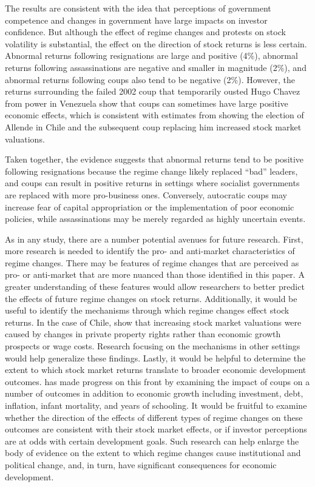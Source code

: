 \documentclass[12pt,final,fleqn]{article}
\theoremstyle{plain}
\begin{document}
The results are consistent with the idea that perceptions of government competence and changes in government have large impacts on investor confidence. But although the effect of regime changes and protests on stock volatility is substantial, the effect on the direction of stock returns is less certain. Abnormal returns following resignations are large and positive (4\%), abnormal returns following assassinations are negative and smaller in magnitude (2\%), and abnormal returns following coups also tend to be negative (2\%). However, the returns surrounding the failed 2002 coup that temporarily ousted Hugo Chavez from power in Venezuela show that coups can sometimes have large positive economic effects, which is consistent with estimates from \citet{girardi2018institution} showing  the election of Allende in Chile and the subsequent coup replacing him increased stock market valuations. 

Taken together, the evidence suggests that abnormal returns tend to be positive following resignations because the regime change likely replaced ``bad'' leaders, and coups can result in positive returns in settings where socialist governments are replaced with more pro-business ones. Conversely, autocratic coups may increase fear of capital appropriation or the implementation of poor economic policies, while assassinations may be merely regarded as highly uncertain events.  

As in any study, there are a number potential avenues for future research. First, more research is needed to identify the pro- and anti-market characteristics of regime changes. There may be features of regime changes that are perceived as pro- or anti-market that are more nuanced than those identified in this paper. A greater understanding of these features would allow researchers to better predict the effects of future regime changes on stock returns. Additionally, it would be useful to identify the mechanisms through which regime changes effect stock returns. In the case of Chile,  \citet{girardi2018institution} show that increasing stock market valuations were caused by changes in private property rights rather than economic growth prospects or wage costs. Research focusing on the mechanisms in other settings would help generalize these findings. Lastly, it would be helpful to determine the extent to which stock market returns translate to broader economic development outcomes. \citet{meyersson2016political} has made progress on this front by examining the impact of coups on a number of outcomes in addition to economic growth including investment, debt, inflation, infant mortality, and years of schooling. It would be fruitful to examine whether the direction of the effects of different types of regime changes on these outcomes are consistent with their stock market effects, or if investor perceptions are at odds with certain development goals. Such research can help enlarge the body of evidence on the extent to which regime changes cause institutional and political change, and, in turn, have significant consequences for economic development.
\end{document}
